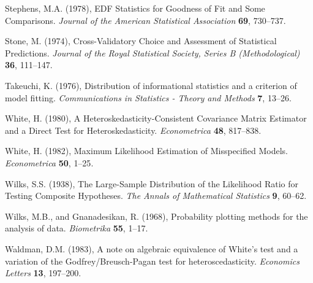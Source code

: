 \phantom{a}

\rff Stephens, M.A. (1978),
      EDF Statistics for Goodness of Fit and Some Comparisons.
      {\it Journal of the American Statistical Association}
      {\bf 69}, {730--737}.

\phantom{a}

\rff Stone, M. (1974),
      Cross-Validatory Choice and Assessment of Statistical Predictions.
      {\it Journal of the Royal Statistical Society, Series B (Methodological)}
      {\bf 36}, {111--147}.

\phantom{a}

\rff Takeuchi, K. (1976),
      Distribution of informational statistics and a criterion of model fitting.
      {\it Communications in Statistics - Theory and Methods}
      {\bf 7}, {13--26}.

\phantom{a}

\rff White, H. (1980),
      A Heteroskedasticity-Consistent Covariance Matrix Estimator and a Direct Test for Heteroskedasticity.
      {\it Econometrica}
      {\bf 48}, {817--838}.

\phantom{a}

\rff White, H. (1982),
      Maximum Likelihood Estimation of Misspecified Models.
      {\it Econometrica}
      {\bf 50}, {1--25}.

\phantom{a}

\rff Wilks, S.S. (1938),
      The Large-Sample Distribution of the Likelihood Ratio for Testing Composite Hypotheses.
      {\it The Annals of Mathematical Statistics}
      {\bf 9}, {60--62}.

\phantom{a}

\rff Wilks, M.B., and Gnanadesikan, R. (1968),
      Probability plotting methods for the analysis of data.
      {\it Biometrika}
      {\bf 55}, {1--17}.

\phantom{a}

\rff Waldman, D.M. (1983),
      A note on algebraic equivalence of White's test and a variation of the Godfrey/Breusch-Pagan test for heteroscedasticity.
      {\it Economics Letters}
      {\bf 13}, {197--200}.

